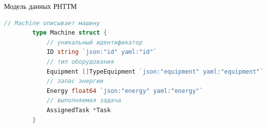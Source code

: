 \begin{ListingEnv}
	\captiondelim{ }
	\caption{Модель данных РНТТМ}\label{lst:machine}
	\begin{lstlisting}[language=Go]
		// Machine описывает машину
		type Machine struct {
			// уникальный идентификатор
			ID string `json:"id" yaml:"id"`
			// тип оборудования
			Equipment []TypeEquipment `json:"equipment" yaml:"equipment"`
			// запас энергии
			Energy float64 `json:"energy" yaml:"energy"`
			// выполняемая задача
			AssignedTask *Task
		}
	\end{lstlisting}
\end{ListingEnv}

\begingroup
\small
\renewcommand{\arraystretch}{0.9}
\setlength{\tabcolsep}{3pt}
\setlength{\LTpre}{0pt}
\setlength{\LTpost}{0pt}
\setlength{\extrarowheight}{0pt}
\setlength{\LTleft}{0pt}
\setlength{\LTright}{0pt}

